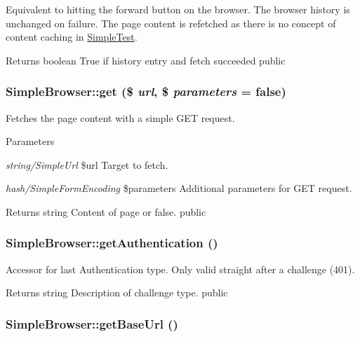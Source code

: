 \label{class_simple_browser_afa6e04c5baef77dd916a61c8f69c1ab2}
Equivalent to hitting the forward button on the browser. The browser history is unchanged on failure. The page content is refetched as there is no concept of content caching in \hyperlink{class_simple_test}{SimpleTest}. \begin{DoxyReturn}{Returns}
boolean True if history entry and fetch succeeded  public 
\end{DoxyReturn}
\hypertarget{class_simple_browser_a315bb345eed9aec7e0854379b1c8008a}{
\subsubsection[{get}]{\setlength{\rightskip}{0pt plus 5cm}SimpleBrowser::get (\$ {\em url}, \/  \$ {\em parameters} = {\ttfamily false})}}
\label{class_simple_browser_a315bb345eed9aec7e0854379b1c8008a}
Fetches the page content with a simple GET request. 
\begin{DoxyParams}{Parameters}
\item[{\em string/SimpleUrl}]\$url Target to fetch. \item[{\em hash/SimpleFormEncoding}]\$parameters Additional parameters for GET request. \end{DoxyParams}
\begin{DoxyReturn}{Returns}
string Content of page or false.  public 
\end{DoxyReturn}
\hypertarget{class_simple_browser_a64b60f41bbd36857d8157c30314344fd}{
\subsubsection[{getAuthentication}]{\setlength{\rightskip}{0pt plus 5cm}SimpleBrowser::getAuthentication ()}}
\label{class_simple_browser_a64b60f41bbd36857d8157c30314344fd}
Accessor for last Authentication type. Only valid straight after a challenge (401). \begin{DoxyReturn}{Returns}
string Description of challenge type.  public 
\end{DoxyReturn}
\hypertarget{class_simple_browser_ade478f581d42d5c7fafbc62015a8c5b2}{
\subsubsection[{getBaseUrl}]{\setlength{\rightskip}{0pt plus 5cm}SimpleBrowser::getBaseUrl ()}}
